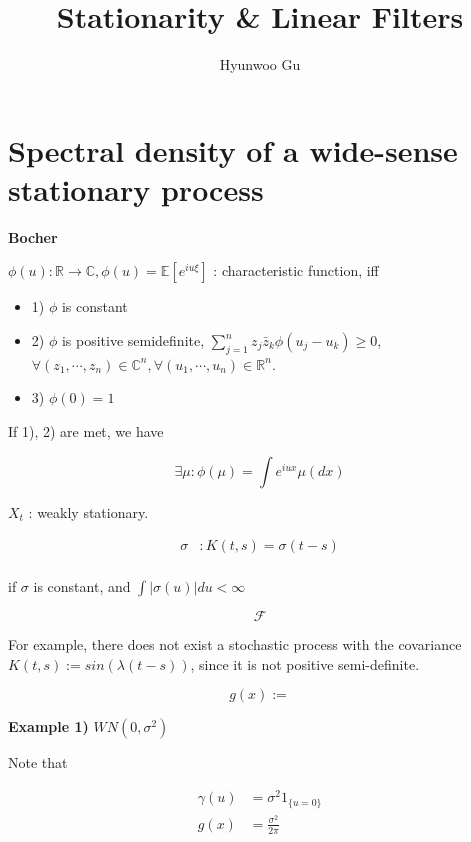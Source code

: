 \documentclass[12pt]{article}
\theoremstyle{nonumberbreak}
\begin{document}
\title{\textbf{Stationarity \& Linear Filters}}
\author{Hyunwoo Gu}
\date{}

\maketitle

\section{Spectral density of a wide-sense stationary process}


\textbf{Bocher}

$\phi(u): \mathbb{R} \to \mathbb{C}, \phi(u) = \mathbb{E} [e^{iu\xi}]$ : characteristic function, iff

\begin{itemize}
	\item 1) $\phi$ is constant
	\item 2) $\phi$ is positive semidefinite, $\sum_{j=1}^n z_j \bar{z}_k \phi(u_j - u_k) \ge 0$, $\forall (z_1, \cdots, z_n) \in \mathbb{C}^n, \forall (u_1, \cdots, u_n) \in \mathbb{R}^n$.
	\item 3) $\phi(0) = 1$
\end{itemize}

If 1), 2) are met, we have 

$$
\exists \mu: \phi(\mu) = \int e^{iux} \mu (dx)
$$



$X_t$ : weakly stationary. 

$$
\begin{aligned}
\sigma &: K(t,s) = \sigma(t-s) \\[8pt]
\end{aligned}
$$

if $\sigma$ is constant, and $\int |\sigma (u)| du < \infty $ 

$$
\mathcal{F}
$$


For example, there does not exist a stochastic process with the covariance $K(t,s) := sin( \lambda (t-s) )$, since it is not positive semi-definite.


$$
g(x) := 
$$


\textbf{Example 1)} $WN(0, \sigma^2)$

Note that 

$$
\begin{aligned}
\gamma(u) &= \sigma^2 1_{\{ u = 0 \}} \\[8pt]
g(x) &= \frac{\sigma^2}{2\pi}
\end{aligned}
$$
\end{document}
